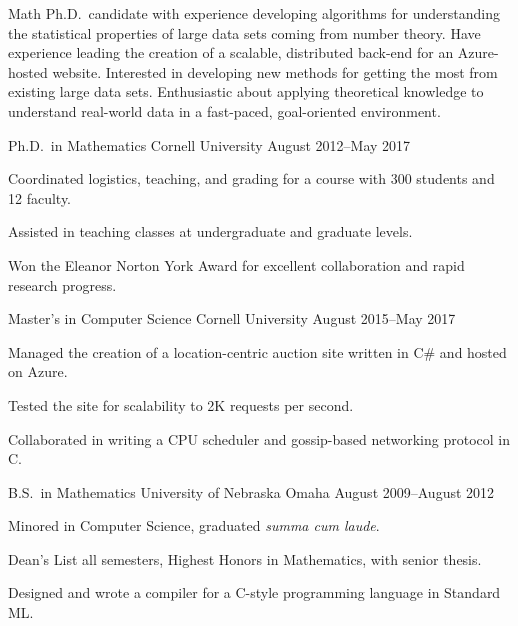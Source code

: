 \documentclass[11pt, letterpaper]{awesome-cv}
\begin{document}
\makecvheader






\begin{cvparagraph}
Math Ph.D.~candidate with experience developing algorithms for understanding the statistical properties of large data sets coming from number theory. 
Have experience leading the creation of a scalable, distributed back-end for an Azure-hosted website. 
Interested in developing new methods for getting the most from existing large data sets. 
Enthusiastic about applying theoretical knowledge to understand real-world data in a fast-paced, goal-oriented environment.
\end{cvparagraph}






\begin{cventries}

\cventry
	{Ph.D.~in Mathematics}
	{Cornell University}
	{}
	{August 2012--May 2017}
	{
		\begin{cvitems}
			\item{Coordinated logistics, teaching, and grading for a course with 300 students and 12 faculty.}
			\item{Assisted in teaching classes at undergraduate and graduate levels.}
			\item{Won the Eleanor Norton York Award for excellent collaboration and rapid research progress.}
		\end{cvitems}
	}
	
\cventry
	{Master's in Computer Science}
	{Cornell University}
	{}
	{August 2015--May 2017}
	{
		\begin{cvitems}
			\item{Managed the creation of a location-centric auction site written in C\# and hosted on Azure.}
			\item{Tested the site for scalability to 2K requests per second.}
			\item{Collaborated in writing a CPU scheduler and gossip-based networking protocol in C.}
		\end{cvitems}
	}
	
\cventry
	{B.S.~in Mathematics}
	{University of Nebraska Omaha}
	{}
	{August 2009--August 2012}
	{
		\begin{cvitems}
			\item{Minored in Computer Science, graduated \emph{summa cum laude}.}
			\item{Dean's List all semesters, Highest Honors in Mathematics, with senior thesis.}
			\item{Designed and wrote a compiler for a C-style programming language in Standard ML.}
		\end{cvitems}
	}
	
\end{cventries}
\end{document}
